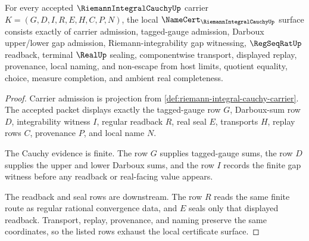 \begin{theorem}
\label{thm:riemann-integral-cauchy-namecert-obligations}
For every accepted $\RiemannIntegralCauchyUp$ carrier $K=(G,D,I,R,E,H,C,P,N)$, the local $\NameCert_{\RiemannIntegralCauchyUp}$ surface consists exactly of carrier admission, tagged-gauge admission, Darboux upper/lower gap admission, Riemann-integrability gap witnessing, $\RegSeqRatUp$ readback, terminal $\RealUp$ sealing, componentwise transport, displayed replay, provenance, local naming, and non-escape from host limits, quotient equality, choice, measure completion, and ambient real completeness.
\end{theorem}
\begin{proof}
Carrier admission is projection from \autoref{def:riemann-integral-cauchy-carrier}. The accepted packet displays exactly the tagged-gauge row $G$, Darboux-sum row $D$, integrability witness $I$, regular readback $R$, real seal $E$, transports $H$, replay rows $C$, provenance $P$, and local name $N$.

The Cauchy evidence is finite. The row $G$ supplies tagged-gauge sums, the row $D$ supplies the upper and lower Darboux sums, and the row $I$ records the finite gap witness before any readback or real-facing value appears.

The readback and seal rows are downstream. The row $R$ reads the same finite route as regular rational convergence data, and $E$ seals only that displayed readback. Transport, replay, provenance, and naming preserve the same coordinates, so the listed rows exhaust the local certificate surface.
\end{proof}

